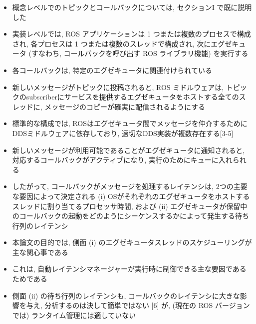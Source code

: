 \begin{frame}{}
    \begin{itemize}
        \item 概念レベルでのトピックとコールバックについては, セクションI で既に説明した
        \item 実装レベルでは, ROS アプリケーションは 1 つまたは複数のプロセスで構成され, 各プロセスは 1 つまたは複数のスレッドで構成され, 次にエグゼキュータ (すなわち, コールバックを呼び出す ROS ライブラリ機能) を実行する
        \item 各コールバックは, 特定のエグゼキュータに関連付けられている
        \item 新しいメッセージがトピックに投稿されると, ROS ミドルウェアは, トピックのsubscriberにサービスを提供するエグゼキュータをホストする全てのスレッドに, メッセージのコピーが確実に配信されるようにする
        \item 標準的な構成では, ROSはエグゼキュータ間でメッセージを仲介するためにDDSミドルウェアに依存しており, 適切なDDS実装が複数存在する[3-5]
    \end{itemize}
\end{frame}

\begin{frame}{}
    \begin{itemize}
        \item 新しいメッセージが利用可能であることがエグゼキュータに通知されると, 対応するコールバックがアクティブになり, 実行のためにキューに入れられる
        \item したがって, コールバックがメッセージを処理するレイテンシは, 2つの主要な要因によって決定される (i) OSがそれぞれのエグゼキュータをホストするスレッドに割り当てるプロセッサ時間, および (ii) エグゼキュータが保留中のコールバックの起動をどのようにシーケンスするかによって発生する待ち行列のレイテンシ
    \end{itemize}
\end{frame}

\begin{frame}{}
    \begin{itemize}
        \item 本論文の目的では, 側面 (i) のエグゼキュータスレッドのスケジューリングが主な関心事である
        \item これは, 自動レイテンシマネージャーが実行時に制御できる主な要因であるためである
        \item 側面 (ii) の待ち行列のレイテンシも, コールバックのレイテンシに大きな影響を与え, 分析するのは決して簡単ではない [6] が, (現在の ROS バージョンでは) ランタイム管理には適していない
    \end{itemize}
\end{frame}

